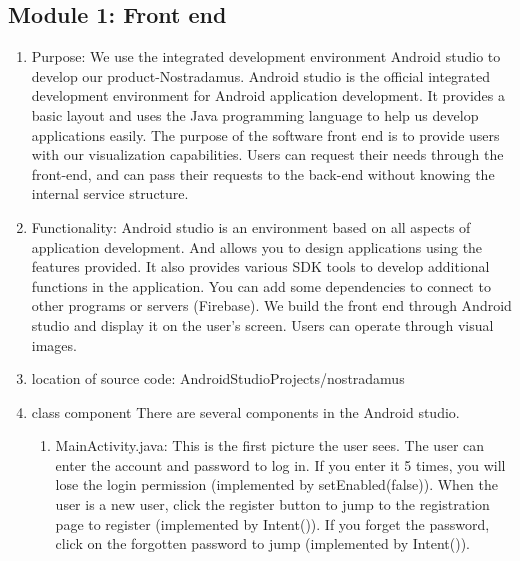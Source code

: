 \documentclass[conference]{IEEEtran}
\begin{document}
\subsection{Module 1: Front end}

\begin{enumerate}

 \item Purpose:
 We use the integrated development environment Android studio to develop our product-Nostradamus. Android studio is the official integrated development environment for Android application development. It provides a basic layout and uses the Java programming language to help us develop applications easily. The purpose of the software front end is to provide users with our visualization capabilities. Users can request their needs through the front-end, and can pass their requests to the back-end without knowing the internal service structure.\vspace{1\baselineskip}
 
 \item Functionality:
 Android studio is an environment based on all aspects of application development. And allows you to design applications using the features provided. It also provides various SDK tools to develop additional functions in the application. You can add some dependencies to connect to other programs or servers (Firebase). We build the front end through Android studio and display it on the user's screen. Users can operate through visual images.\vspace{1\baselineskip}
 
 \item location of source code:
 AndroidStudioProjects/nostradamus\vspace{1\baselineskip}
 
 \item class component
 There are several components in the Android studio.
     
        
        \begin{enumerate}
        
        \item MainActivity.java:
        This is the first picture the user sees. The user can enter the account and password to log in. If you enter it 5 times, you will lose the login permission (implemented by setEnabled(false)). When the user is a new user, click the register button to jump to the registration page to register (implemented by Intent()). If you forget the password, click on the forgotten password to jump (implemented by Intent()).\vspace{1\baselineskip}
        

\end{enumerate}
\end{enumerate}
\end{document}
